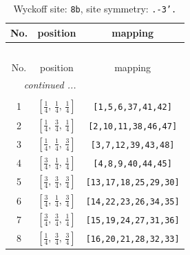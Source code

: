 \documentclass[fleqn,8pt]{jsarticle}
\begin{document}
\begin{longtable}{ccc}
\caption{Wyckoff site: {\tt 8b}, site symmetry: {\tt .-3'.}}
 \\
 \hline \hline
No. & position & mapping \\ \hline \endfirsthead

\multicolumn{2}{l}{\tablename\ \thetable{}} \\
 \hline \hline
No. & position & mapping \\ \hline \endhead

 \hline \hline
\multicolumn{2}{r}{\footnotesize\it continued ...} \\ \endfoot

 \hline \hline
\multicolumn{2}{r}{} \\ \endlastfoot

1 & $\left[ \frac{1}{4},\, \frac{1}{4},\, \frac{1}{4} \right]$ & {\tt [1,5,6,37,41,42]} \\ \hline
2 & $\left[ \frac{1}{4},\, \frac{3}{4},\, \frac{1}{4} \right]$ & {\tt [2,10,11,38,46,47]} \\ \hline
3 & $\left[ \frac{1}{4},\, \frac{1}{4},\, \frac{3}{4} \right]$ & {\tt [3,7,12,39,43,48]} \\ \hline
4 & $\left[ \frac{3}{4},\, \frac{1}{4},\, \frac{1}{4} \right]$ & {\tt [4,8,9,40,44,45]} \\ \hline
5 & $\left[ \frac{3}{4},\, \frac{3}{4},\, \frac{3}{4} \right]$ & {\tt [13,17,18,25,29,30]} \\ \hline
6 & $\left[ \frac{3}{4},\, \frac{1}{4},\, \frac{3}{4} \right]$ & {\tt [14,22,23,26,34,35]} \\ \hline
7 & $\left[ \frac{3}{4},\, \frac{3}{4},\, \frac{1}{4} \right]$ & {\tt [15,19,24,27,31,36]} \\ \hline
8 & $\left[ \frac{1}{4},\, \frac{3}{4},\, \frac{3}{4} \right]$ & {\tt [16,20,21,28,32,33]} \\
\end{longtable}
\renewcommand{\arraystretch}{1.2}
\end{document}
